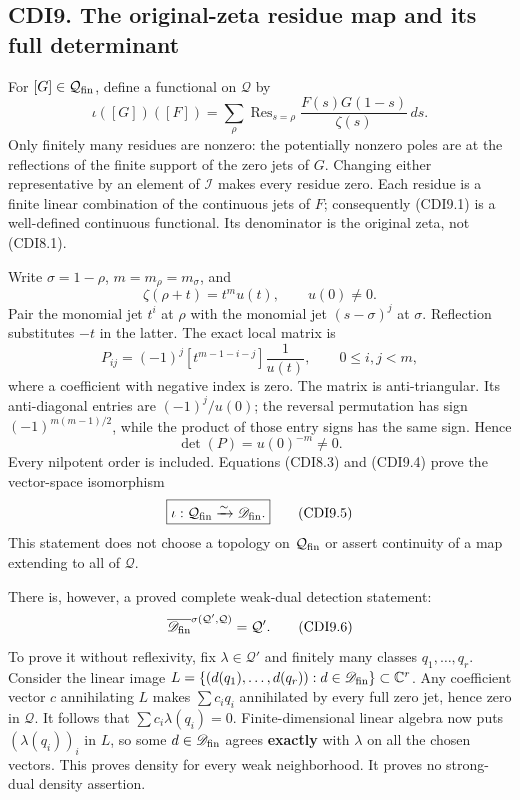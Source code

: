 \subsection{CDI9. The original-zeta residue map and its full
determinant}\label{cdi9.-the-original-zeta-residue-map-and-its-full-determinant}

For \([G]\in\mathcal Q_{\rm fin}\), define a functional on
\(\mathcal Q\) by \[
\iota([G])([F])=
\sum_{\rho}\operatorname{Res}_{s=\rho}
\frac{F(s)G(1-s)}{\zeta(s)}\,ds.
\tag{CDI9.1}
\] Only finitely many residues are nonzero: the potentially nonzero
poles are at the reflections of the finite support of the zero jets of
\(G\). Changing either representative by an element of \(\mathcal I\)
makes every residue zero. Each residue is a finite linear combination of
the continuous jets of \(F\); consequently (CDI9.1) is a well-defined
continuous functional. Its denominator is the original zeta, not
(CDI8.1).

Write \(\sigma=1-\rho\), \(m=m_\rho=m_\sigma\), and \[
\zeta(\rho+t)=t^m u(t),\qquad u(0)\ne0.
\tag{CDI9.2}
\] Pair the monomial jet \(t^i\) at \(\rho\) with the monomial jet
\((s-\sigma)^j\) at \(\sigma\). Reflection substitutes \(-t\) in the
latter. The exact local matrix is \[
P_{ij}=(-1)^j[t^{m-1-i-j}]\frac1{u(t)},
\qquad 0\le i,j<m,
\tag{CDI9.3}
\] where a coefficient with negative index is zero. The matrix is
anti-triangular. Its anti-diagonal entries are \((-1)^j/u(0)\); the
reversal permutation has sign \((-1)^{m(m-1)/2}\), while the product of
those entry signs has the same sign. Hence \[
\boxed{\det(P)=u(0)^{-m}\ne0.}
\tag{CDI9.4}
\] Every nilpotent order is included. Equations (CDI8.3) and (CDI9.4)
prove the vector-space isomorphism \[
\boxed{\iota:\mathcal Q_{\rm fin}\xrightarrow{\sim}\mathscr D_{\rm fin}.}
\tag{CDI9.5}
\] This statement does not choose a topology on \(\mathcal Q_{\rm fin}\)
or assert continuity of a map extending to all of \(\mathcal Q\).

There is, however, a proved complete weak-dual detection statement: \[
\overline{\mathscr D_{\rm fin}}^{\sigma(\mathcal Q',\mathcal Q)}
=\mathcal Q'.
\tag{CDI9.6}
\] To prove it without reflexivity, fix \(\lambda\in\mathcal Q'\) and
finitely many classes \(q_1,\ldots,q_r\). Consider the linear image
\(L=\{(d(q_1),\ldots,d(q_r)):d\in\mathscr D_{\rm fin}\}\subset\mathbb C^r\).
Any coefficient vector \(c\) annihilating \(L\) makes \(\sum c_iq_i\)
annihilated by every full zero jet, hence zero in \(\mathcal Q\). It
follows that \(\sum c_i\lambda(q_i)=0\). Finite-dimensional linear
algebra now puts \((\lambda(q_i))_i\) in \(L\), so some
\(d\in\mathscr D_{\rm fin}\) agrees \textbf{exactly} with \(\lambda\) on
all the chosen vectors. This proves density for every weak neighborhood.
It proves no strong-dual density assertion.

